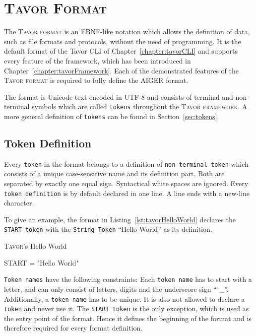 \chapter{\textsc{Tavor Format}}
\label{chapter:tavorFormat}

The \textsc{Tavor format} is an EBNF-like notation which allows the definition of data, such as file formats and protocols, without the need of programming. It is the default format of the Tavor CLI of Chapter~\ref{chapter:tavorCLI} and supports every feature of the framework, which has been introduced in Chapter~\ref{chapter:tavorFramework}. Each of the demonstrated features of the \textsc{Tavor format} is required to fully define the AIGER format.

The format is Unicode text encoded in UTF-8 and consists of terminal and non-terminal symbols which are called \texttt{tokens} throughout the \textsc{Tavor framework}. A more general definition of \texttt{tokens} can be found in Section~\ref{sec:tokens}.

\section{Token Definition}
\label{sec:tokenDefinition}

Every \texttt{token} in the format belongs to a definition of \texttt{non-terminal token} which consists of a unique case-sensitive name and its definition part. Both are separated by exactly one equal sign. Syntactical white spaces are ignored. Every \texttt{token definition} is by default declared in one line. A line ends with a new-line character.

To give an example, the format in Listing~\ref{lst:tavorHelloWorld} declares the \texttt{START token} with the \texttt{String Token} \enquote{Hello World} as its definition.

\begin{listing}
\caption{\textsc{Tavor}'s Hello World}
\label{lst:tavorHelloWorld}
\begin{gocode}
START = "Hello World"
\end{gocode}
\end{listing}

\texttt{Token names} have the following constraints: Each \texttt{token name} has to start with a letter, and can only consist of letters, digits and the underscore sign \enquote{\char`_}. Additionally, a \texttt{token name} has to be unique. It is also not allowed to declare a \texttt{token} and never use it. The \texttt{START token} is the only exception, which is used as the entry point of the format. Hence it defines the beginning of the format and is therefore required for every format definition.

